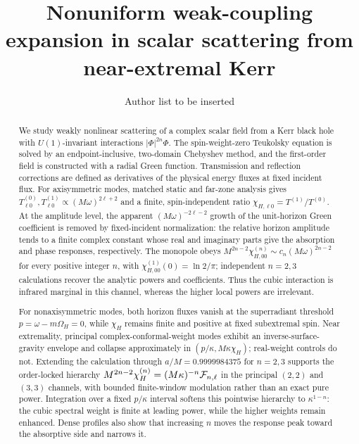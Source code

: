 \documentclass[aps,prd,twocolumn,10pt,nofootinbib,superscriptaddress,floatfix]{revtex4-2}
\begin{document}
\title{Nonuniform weak-coupling expansion in scalar scattering from near-extremal Kerr}

\author{Author list to be inserted}

\begin{abstract}
We study weakly nonlinear scattering of a complex scalar field from a Kerr
black hole with $U(1)$-invariant interactions $|\Phi|^{2n}\Phi$.  The
spin-weight-zero Teukolsky equation is solved by an endpoint-inclusive,
two-domain Chebyshev method, and the first-order field is constructed with a
radial Green function.  Transmission and reflection corrections are defined
as derivatives of the physical energy fluxes at fixed incident flux.  For
axisymmetric modes, matched static and far-zone analysis gives
$T^{(0)}_{\ell0},T^{(1)}_{\ell0}\propto(M\omega)^{2\ell+2}$ and a finite,
spin-independent ratio $\chi_{H,\ell0}=T^{(1)}/T^{(0)}$.  At the amplitude
level, the apparent $(M\omega)^{-2\ell-2}$ growth of the unit-horizon Green
coefficient is removed by fixed-incident normalization: the relative horizon
amplitude tends to a finite complex constant whose real and imaginary parts
give the absorption and phase responses, respectively.  The monopole obeys
$M^{2n-2}\chi^{(n)}_{H,00}\sim c_n(M\omega)^{2n-2}$ for every positive integer
$n$, with $\chi_{H,00}^{(1)}(0)=\ln2/\pi$; independent $n=2,3$ calculations
recover the analytic powers and coefficients.  Thus the cubic interaction is
infrared marginal in this channel, whereas the higher local powers are
irrelevant.

For nonaxisymmetric modes, both horizon fluxes vanish at the superradiant
threshold $p=\omega-m\Omega_H=0$, while $\chi_H$ remains finite and positive
at fixed subextremal spin.  Near extremality, principal
complex-conformal-weight modes exhibit an inverse-surface-gravity envelope and
collapse approximately in $(p/\kappa,M\kappa\chi_H)$; real-weight controls do
not.  Extending the calculation through $a/M=0.9999984375$ for $n=2,3$
supports the order-locked hierarchy
$M^{2n-2}\chi_H^{(n)}=(M\kappa)^{-n}{\cal F}_{n,\ell}$ in the principal
$(2,2)$ and $(3,3)$ channels, with bounded finite-window modulation rather
than an exact pure power.  Integration over a fixed $p/\kappa$ interval
softens this pointwise hierarchy to $\kappa^{1-n}$: the cubic spectral weight
is finite at leading power, while the higher weights remain enhanced.  Dense
profiles also show that increasing $n$ moves the response peak toward the
absorptive side and narrows it.


\end{abstract}
\end{document}
